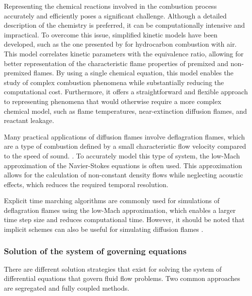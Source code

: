 Representing the chemical reactions involved in the combustion process accurately and efficiently poses a significant challenge. Although a detailed description of the chemistry is preferred, it can be computationally intensive and impractical. To overcome this issue, simplified kinetic models have been developed, such as the one presented by \textcite{fernandez-tarrazoSimpleOnestepChemistry2006} for hydrocarbon combustion with air. This model correlates kinetic parameters with the equivalence ratio, allowing for better representation of the characteristic flame properties of premixed and non-premixed flames. By using a single chemical equation, this model enables the study of complex combustion phenomena while substantially reducing the computational cost. Furthermore, it offers a straightforward and flexible approach to representing phenomena that would otherwise require a more complex chemical model, such as flame temperatures, near-extinction diffusion flames, and reactant leakage.
 
Many practical applications of diffusion flames involve deflagration flames, which are a type of combustion defined by a small characteristic flow velocity compared to the speed of sound.  \parencite{poinsotTheoreticalNumericalCombustion2005}. To accurately model this type of system, the low-Mach approximation of the Navier-Stokes equations is often used. This approximation allows for the calculation of non-constant density flows while neglecting acoustic effects, which reduces the required temporal resolution. 

Explicit time marching algorithms are commonly used for simulations of deflagration flames using the low-Mach approximation, which enables a larger time step size and reduces computational time. However, it should be noted that implicit schemes can also be useful for simulating diffusion flames \parencite{mullerLowMachNumberAsymptoticsNavierStokes1998}. 
\subsubsection{Solution of the system of governing equations}

There are different solution strategies that exist for solving the system of differential equations that govern fluid flow problems. Two common approaches are segregated and fully coupled methods.

